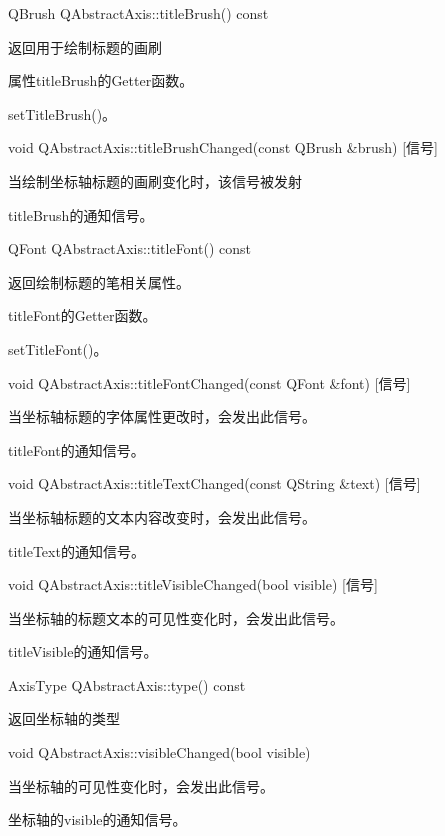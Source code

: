 QBrush QAbstractAxis::titleBrush() const 

返回用于绘制标题的画刷

\begin{notice}
属性titleBrush的Getter函数。
\end{notice}

\begin{seeAlso}
setTitleBrush()。
\end{seeAlso}

void QAbstractAxis::titleBrushChanged(const QBrush \&brush) [信号] 

当绘制坐标轴标题的画刷变化时，该信号被发射 

\begin{notice}
titleBrush的通知信号。
\end{notice}

QFont QAbstractAxis::titleFont() const 

返回绘制标题的笔相关属性。 

\begin{notice}
titleFont的Getter函数。
\end{notice}

\begin{seeAlso}
setTitleFont()。
\end{seeAlso}

void QAbstractAxis::titleFontChanged(const QFont \&font) [信号]

当坐标轴标题的字体属性更改时，会发出此信号。 

\begin{notice}
titleFont的通知信号。
\end{notice}

void QAbstractAxis::titleTextChanged(const QString \&text) [信号] 

当坐标轴标题的文本内容改变时，会发出此信号。 

\begin{notice}
titleText的通知信号。
\end{notice}

void QAbstractAxis::titleVisibleChanged(bool visible) [信号] 

当坐标轴的标题文本的可见性变化时，会发出此信号。 

\begin{notice}
titleVisible的通知信号。
\end{notice}

AxisType QAbstractAxis::type() const 

返回坐标轴的类型

void QAbstractAxis::visibleChanged(bool visible) 

当坐标轴的可见性变化时，会发出此信号。 

\begin{notice}
坐标轴的visible的通知信号。
\end{notice}